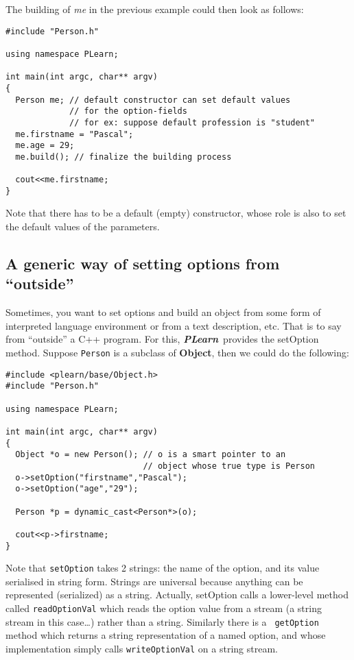 \documentclass[11pt]{book}
\newcommand{\PLearn}{{\bf \it PLearn}}
\newcommand{\Object}{{\bf Object}}
\begin{document}
The building of {\em me} in the previous example could then look
as follows:

\begin{verbatim}
#include "Person.h"

using namespace PLearn;

int main(int argc, char** argv)
{
  Person me; // default constructor can set default values 
             // for the option-fields
             // for ex: suppose default profession is "student"
  me.firstname = "Pascal";
  me.age = 29;
  me.build(); // finalize the building process

  cout<<me.firstname; 
}
\end{verbatim}

Note that there has to be a default (empty) constructor, whose role is also
to set the default values of the parameters.


\subsection{A generic way of setting options from ``outside''}

Sometimes, you want to set options and build an object from some
form of interpreted language environment or from a text description,
etc. That is to say from ``outside'' a C++ program. For this, \PLearn\ 
provides the setOption method. Suppose {\tt Person} is a subclass of
\Object, then we could do the following:

\begin{verbatim}
#include <plearn/base/Object.h>
#include "Person.h"

using namespace PLearn;

int main(int argc, char** argv)
{
  Object *o = new Person(); // o is a smart pointer to an 
                            // object whose true type is Person
  o->setOption("firstname","Pascal");
  o->setOption("age","29");

  Person *p = dynamic_cast<Person*>(o);

  cout<<p->firstname;
}
\end{verbatim}

Note that {\tt setOption} takes 2 strings: the name of the option, and
its value serialised in string form. Strings are universal because
anything can be represented (serialized) as a string. Actually,
setOption calls a lower-level method called {\tt readOptionVal}
which reads the option value from a stream (a string stream in
this case\ldots) rather than a string. Similarly there is a {\tt
getOption} method which returns a string representation of a named
option, and whose implementation simply calls {\tt writeOptionVal}
on a string stream.
\end{document}
